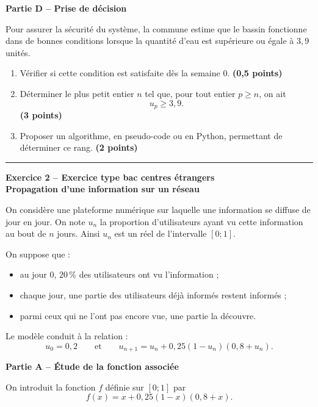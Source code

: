 \documentclass[11pt,a4paper]{article}
\newcommand{\bareme}[1]{\hfill{\color{blue!70!black}\textbf{(#1 points)}}}
\begin{document}
\medskip

\textbf{Partie D -- Prise de décision}

Pour assurer la sécurité du système, la commune estime que le bassin fonctionne dans de bonnes conditions lorsque la quantité d’eau est supérieure ou égale à $3{,}9$ unités.

\begin{enumerate}[label=\textbf{D.\arabic*.}, leftmargin=0.9cm]
    \item Vérifier si cette condition est satisfaite dès la semaine $0$. \bareme{0,5}
    \item Déterminer le plus petit entier $n$ tel que, pour tout entier $p\geq n$, on ait
    \[
    u_p\geq 3{,}9.
    \]
    \bareme{3}
    \item Proposer un algorithme, en pseudo-code ou en Python, permettant de déterminer ce rang. \bareme{2}
\end{enumerate}

\vspace{0.4cm}
\hrule
\vspace{0.4cm}
\newpage
\begin{center}
    \textbf{\large Exercice 2 -- Exercice type bac centres étrangers}\\
    \textbf{Propagation d’une information sur un réseau}
\end{center}

On considère une plateforme numérique sur laquelle une information se diffuse de jour en jour. On note $u_n$ la proportion d’utilisateurs ayant vu cette information au bout de $n$ jours. Ainsi $u_n$ est un réel de l’intervalle $[0;1]$.

On suppose que :
\begin{itemize}[leftmargin=0.7cm]
    \item au jour $0$, $20\,\%$ des utilisateurs ont vu l’information ;
    \item chaque jour, une partie des utilisateurs déjà informés restent informés ;
    \item parmi ceux qui ne l’ont pas encore vue, une partie la découvre.
\end{itemize}

Le modèle conduit à la relation :
\[
u_0=0{,}2
\qquad \text{et} \qquad
u_{n+1}=u_n+0{,}25(1-u_n)(0{,}8+u_n).
\]

\medskip

\textbf{Partie A -- Étude de la fonction associée}

On introduit la fonction $f$ définie sur $[0;1]$ par
\[
f(x)=x+0{,}25(1-x)(0{,}8+x).
\]
\end{document}
